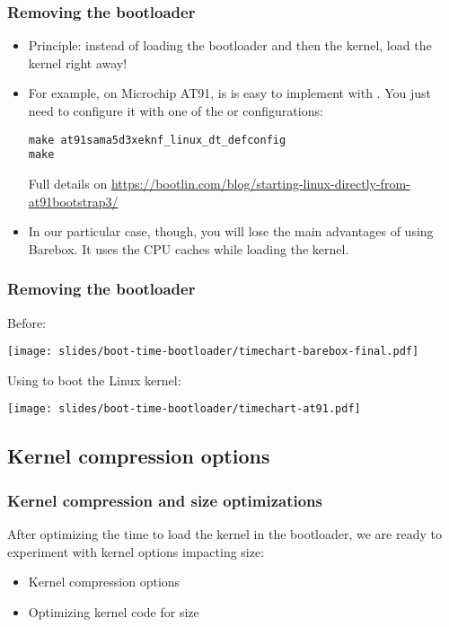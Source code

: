 \begin{frame}[fragile]
\frametitle{Removing the bootloader}
\begin{itemize}
\item Principle: instead of loading the bootloader and then the kernel,
      load the kernel right away!
\item For example, on Microchip AT91, is is easy to implement with
      . You just need to configure it
      with one of the  or  configurations:
\begin{block}{}
\begin{verbatim}
make at91sama5d3xeknf_linux_dt_defconfig
make
\end{verbatim}
\end{block}
      Full details on
      \url{https://bootlin.com/blog/starting-linux-directly-from-at91bootstrap3/}

\item In our particular case, though, you will lose the
      main advantages of using Barebox.  It uses the CPU caches
      while loading the kernel.
\end{itemize}
\end{frame}

\begin{frame}
\frametitle{Removing the bootloader}
Before:
\begin{center}
    \texttt{[image: slides/boot-time-bootloader/timechart-barebox-final.pdf]}
\end{center}
Using  to boot the Linux kernel:
\begin{center}
    \texttt{[image: slides/boot-time-bootloader/timechart-at91.pdf]}
\end{center}
\end{frame}


\subsection{Kernel compression options}

\begin{frame}
\frametitle{Kernel compression and size optimizations}
After optimizing the time to load the kernel in the
bootloader, we are ready to experiment with kernel
options impacting size:
\begin{itemize}
\item Kernel compression options
\item Optimizing kernel code for size
\end{itemize}
\end{frame}

